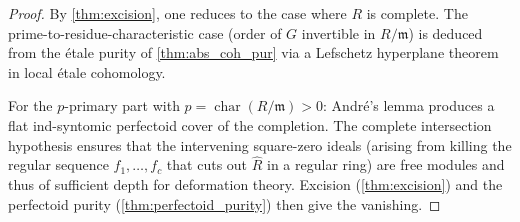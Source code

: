 %
%
%
%
\begin{proof}
  By \cref{thm:excision}, one reduces to the case where \(R\) is complete. The prime-to-residue-characteristic case (order of \(G\) invertible in \(R/\mathfrak{m}\)) is deduced from the étale purity of \cref{thm:abs_coh_pur} via a Lefschetz hyperplane theorem in local étale cohomology.

  For the \(p\)-primary part with \(p = \operatorname{char}(R/\mathfrak{m}) > 0\): André's lemma produces a flat ind-syntomic perfectoid cover of the completion. The complete intersection hypothesis ensures that the intervening square-zero ideals (arising from killing the regular sequence \(f_1, \ldots, f_c\) that cuts out \(\widehat{R}\) in a regular ring) are free modules and thus of sufficient depth for deformation theory. Excision (\cref{thm:excision}) and the perfectoid purity (\cref{thm:perfectoid_purity}) then give the vanishing.
\end{proof}

